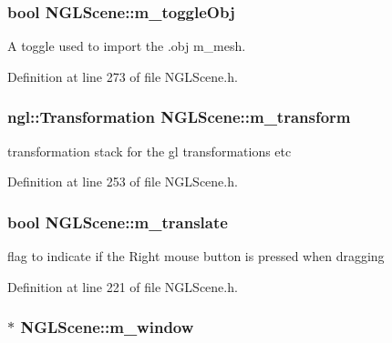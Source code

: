 \subsubsection[{m\-\_\-toggle\-Obj}]{\setlength{\rightskip}{0pt plus 5cm}bool N\-G\-L\-Scene\-::m\-\_\-toggle\-Obj\hspace{0.3cm}{\ttfamily [private]}}\label{class_n_g_l_scene_a206b1a3e59941328d1f86c9ee9f7ad7c}


A toggle used to import the .obj m\-\_\-mesh. 



Definition at line 273 of file N\-G\-L\-Scene.\-h.

\subsubsection[{m\-\_\-transform}]{\setlength{\rightskip}{0pt plus 5cm}ngl\-::\-Transformation N\-G\-L\-Scene\-::m\-\_\-transform\hspace{0.3cm}{\ttfamily [private]}}\label{class_n_g_l_scene_a563c07219c925adf79d1b939a540469f}


transformation stack for the gl transformations etc 



Definition at line 253 of file N\-G\-L\-Scene.\-h.

\subsubsection[{m\-\_\-translate}]{\setlength{\rightskip}{0pt plus 5cm}bool N\-G\-L\-Scene\-::m\-\_\-translate\hspace{0.3cm}{\ttfamily [private]}}\label{class_n_g_l_scene_afb8014abc76ccaa76994ac2ae2ab13e2}


flag to indicate if the Right mouse button is pressed when dragging 



Definition at line 221 of file N\-G\-L\-Scene.\-h.

\subsubsection[{m\-\_\-window}]{$\ast$ N\-G\-L\-Scene\-::m\-\_\-window\hspace{0.3cm}{\ttfamily [private]}}\label{class_n_g_l_scene_ab2e3e9c8faefad16c5f57ca2242d9b04}


